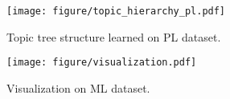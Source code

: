 \begin{figure*}[h]
	\centering
	\texttt{[image: figure/topic\_hierarchy\_pl.pdf]}
	\caption{Topic tree structure learned on PL dataset.}
	\label{fig:topic_interpretability_pl}
\end{figure*}

\begin{figure*}[h]
	\centering
	\texttt{[image: figure/visualization.pdf]}
	\caption{Visualization on ML dataset.}
	\label{fig:visualization}
\end{figure*}